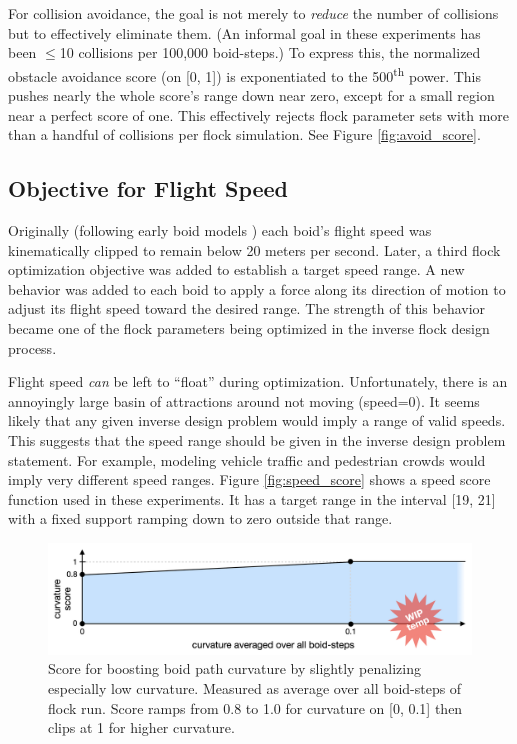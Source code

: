 \documentclass[letterpaper]{article}
\begin{document}
For collision avoidance, the goal is not merely to \textit{reduce} the number of collisions but to effectively eliminate them. (An informal goal in these experiments has been {$\leq$}10 collisions per 100,000 boid-steps.) To express this, the normalized obstacle avoidance score (on [0, 1]) is exponentiated to the 500\textsuperscript{th} power. This pushes nearly the whole score's range down near zero, except for a small region near a perfect score of one. This effectively rejects flock parameter sets with more than a handful of collisions per flock simulation. See Figure \ref{fig:avoid_score}.

\subsection{Objective for Flight Speed}
\label{subsec:speed_objective}

Originally (following early boid models \citep{reynolds_flocks_1987}) each boid's flight speed was kinematically clipped to remain below 20 meters per second. Later, a third flock optimization objective was added to establish a target speed range. A new behavior was added to each boid to apply a force along its direction of motion to adjust its flight speed toward the desired range. The strength of this behavior became one of the flock parameters being optimized in the inverse flock design process.

Flight speed \textit{can} be left to ``float'' during optimization. Unfortunately, there is an annoyingly large basin of attractions around not moving (speed=0). It seems likely that any given inverse design problem would imply a range of valid speeds. This suggests that the speed range should be given in the inverse design problem statement. For example, modeling vehicle traffic and pedestrian crowds would imply very different speed ranges. Figure \ref{fig:speed_score} shows a speed score function used in these experiments. It has a target range in the interval [19, 21] with a fixed support ramping down to zero outside that range.


\begin{figure}[]
    \centering
    \includegraphics[width=0.9\linewidth]{images/temp_curve_score.png}
    \caption{Score for boosting boid path curvature by slightly penalizing especially low curvature. Measured as average over all boid-steps of flock run. Score ramps from 0.8 to 1.0 for curvature on [0, 0.1] then clips at 1 for higher curvature.}
    \label{fig:seed_variance}
\end{figure}
\end{document}
